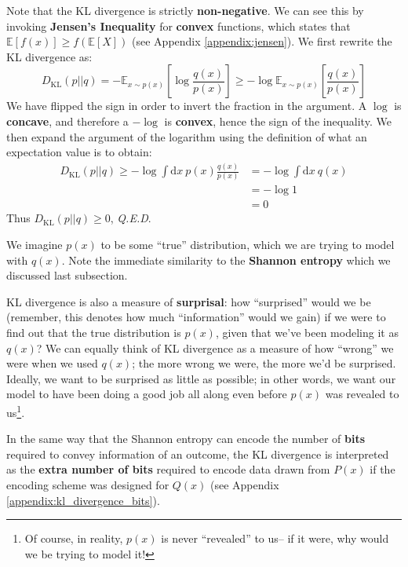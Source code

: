 \documentclass[]{article}
\begin{document}
Note that the KL divergence is strictly \textbf{non-negative}. We can see this by invoking \textbf{Jensen's Inequality} for \textbf{convex} functions, which states that $\mathbb{E}[f(x)] \geq f(\mathbb{E}[X])$ (see Appendix \ref{appendix:jensen}). We first rewrite the KL divergence as:
\begin{equation}\label{eq:KL_signs}
    D_\text{KL}(p||q) = -\mathbb{E}_{x \sim p(x)} \left[\log \frac{q(x)}{p(x)} \right] \geq -\log \mathbb{E}_{x \sim p(x)}\left[\frac{q(x)}{p(x)} \right]
\end{equation}
We have flipped the sign in order to invert the fraction in the argument. A $\log$ is \textbf{concave}, and therefore  a $-\log$ is \textbf{convex}, hence the sign of the inequality. We then expand the argument of the logarithm using the definition of what an expectation value is to obtain:
\begin{align}
    D_\text{KL}(p||q) \geq - \log \int \text{d}x~ p(x) \frac{q(x)}{p(x)} 
    &= - \log \int \text{d}x~q(x)\\
    &= - \log 1 \\
    &= 0
\end{align}
Thus $D_\text{KL}(p||q) \geq 0$, \textit{Q.E.D}.

We imagine $p(x)$ to be some ``true'' distribution, which we are trying to model with $q(x)$. Note the immediate similarity to the \textbf{Shannon entropy} which we discussed last subsection. 

KL divergence is also a measure of \textbf{surprisal}: how ``surprised'' would we be (remember, this denotes how much ``information'' would we gain) if we were to find out that the true distribution is $p(x)$, given that we've been modeling it as $q(x)$? We can equally think of KL divergence as a measure of how ``wrong'' we were when we used $q(x)$; the more wrong we were, the more we'd be surprised. Ideally, we want to be surprised as little as possible; in other words, we want our model to have been doing a good job all along even before $p(x)$ was revealed to us\footnote{Of course, in reality, $p(x)$ is never ``revealed'' to us-- if it were, why would we be trying to model it!}.

In the same way that the Shannon entropy can encode the number of \textbf{bits} required to convey information of an outcome, the KL divergence is interpreted as the \textbf{extra number of bits} required to encode data drawn from $P(x)$ if the encoding scheme was designed for $Q(x)$ \cite{haase2017information} (see Appendix \ref{appendix:kl_divergence_bits}).
\end{document}
